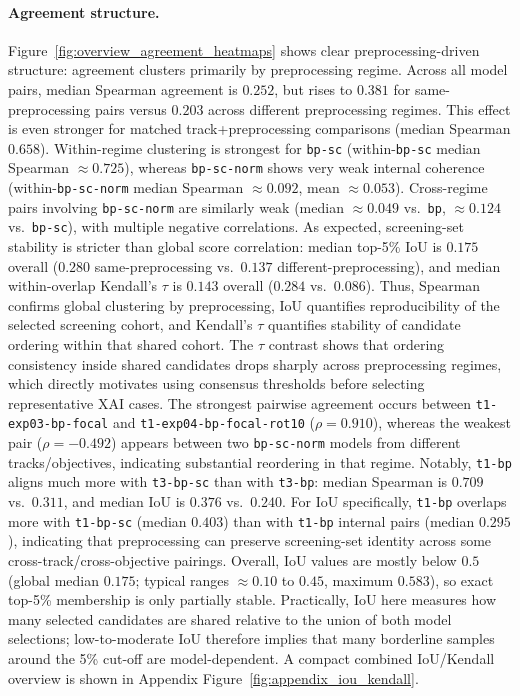 \paragraph{Agreement structure.}
Figure~\ref{fig:overview_agreement_heatmaps} shows clear preprocessing-driven structure: agreement clusters primarily by preprocessing regime. Across all model pairs, median Spearman agreement is \(0.252\), but rises to \(0.381\) for same-preprocessing pairs versus \(0.203\) across different preprocessing regimes.
This effect is even stronger for matched track+preprocessing comparisons (median Spearman \(0.658\)).
Within-regime clustering is strongest for \texttt{bp-sc} (within-\texttt{bp-sc} median Spearman \(\approx 0.725\)), whereas \texttt{bp-sc-norm} shows very weak internal coherence (within-\texttt{bp-sc-norm} median Spearman \(\approx 0.092\), mean \(\approx 0.053\)).
Cross-regime pairs involving \texttt{bp-sc-norm} are similarly weak (median \(\approx 0.049\) vs.\ \texttt{bp}, \(\approx 0.124\) vs.\ \texttt{bp-sc}), with multiple negative correlations.
As expected, screening-set stability is stricter than global score correlation: median top-5\% IoU is \(0.175\) overall (\(0.280\) same-preprocessing vs.\ \(0.137\) different-preprocessing), and median within-overlap Kendall's \(\tau\) is \(0.143\) overall (\(0.284\) vs.\ \(0.086\)).
Thus, Spearman confirms global clustering by preprocessing, IoU quantifies reproducibility of the selected screening cohort, and Kendall's \(\tau\) quantifies stability of candidate ordering within that shared cohort.
The \(\tau\) contrast shows that ordering consistency inside shared candidates drops sharply across preprocessing regimes, which directly motivates using consensus thresholds before selecting representative XAI cases.
The strongest pairwise agreement occurs between \texttt{t1-exp03-bp-focal} and \texttt{t1-exp04-bp-focal-rot10} (\(\rho=0.910\)), whereas the weakest pair (\(\rho=-0.492\)) appears between two \texttt{bp-sc-norm} models from different tracks/objectives, indicating substantial reordering in that regime.
Notably, \texttt{t1-bp} aligns much more with \texttt{t3-bp-sc} than with \texttt{t3-bp}: median Spearman is \(0.709\) vs.\ \(0.311\), and median IoU is \(0.376\) vs.\ \(0.240\).
For IoU specifically, \texttt{t1-bp} overlaps more with \texttt{t1-bp-sc} (median \(0.403\)) than with \texttt{t1-bp} internal pairs (median \(0.295\)), indicating that preprocessing can preserve screening-set identity across some cross-track/cross-objective pairings.
Overall, IoU values are mostly below \(0.5\) (global median \(0.175\); typical ranges \(\approx 0.10\) to \(0.45\), maximum \(0.583\)), so exact top-5\% membership is only partially stable.
Practically, IoU here measures how many selected candidates are shared relative to the union of both model selections; low-to-moderate IoU therefore implies that many borderline samples around the 5\% cut-off are model-dependent.
A compact combined IoU/Kendall overview is shown in Appendix Figure~\ref{fig:appendix_iou_kendall}.

